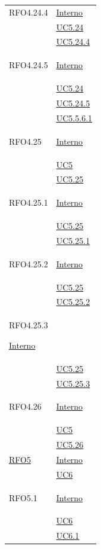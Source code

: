 \begin{itemize}
\begin{itemize}
\begin{itemize}
\begin{itemize}
\begin{longtable}{|>{\centering}m{5cm}|m{5cm}<{\centering}|}
\hypertarget{RFO4.24.4}{RFO4.24.4} &  \hyperlink{Interno}{Interno}\\
&\hyperref[UC5.24]{UC5.24}\\
&\hyperref[UC5.24.4]{UC5.24.4}\\ \hline

\hypertarget{RFO4.24.5}{RFO4.24.5} & \hyperlink{Interno}{Interno}\\
&\hyperref[UC5.24]{UC5.24}\\
&\hyperref[UC5.24.5]{UC5.24.5}\\
&\hyperref[UC5.5.6.1]{UC5.5.6.1}\\ \hline

\hypertarget{RFO4.25}{RFO4.25} & \hyperlink{Interno}{Interno}\\
&\hyperref[UC5]{UC5}\\
&\hyperref[UC5.25]{UC5.25}\\ \hline

\hypertarget{RFO4.25.1}{RFO4.25.1} &  \hyperlink{Interno}{Interno}\\
&\hyperref[UC5.25]{UC5.25}\\
&\hyperref[UC5.25.1]{UC5.25.1}\\ \hline

\hypertarget{RFO4.25.2}{RFO4.25.2} & \hyperlink{Interno}{Interno}\\
&\hyperref[UC5.25]{UC5.25}\\
&\hyperref[UC5.25.2]{UC5.25.2}\\ \hline

\hypertarget{RFO4.25.3}{RFO4.25.3}   \hyperlink{Interno}{Interno}\\
&\hyperref[UC5.25]{UC5.25}\\
&\hyperref[UC5.25.3]{UC5.25.3}\\ \hline

\hypertarget{RFO4.26}{RFO4.26} & \hyperlink{Interno}{Interno}\\
&\hyperref[UC5]{UC5}\\
&\hyperref[UC5.26]{UC5.26}\\ \hline


\hyperlink{RFO5}{RFO5} & \hyperlink{Interno}{Interno}\\
& \hyperref[UC6]{UC6}\\ \hline

\hypertarget{RFO5.1}{RFO5.1}&  \hyperlink{Interno}{Interno}\\
& \hyperref[UC6]{UC6}\\
& \hyperref[UC6.1]{UC6.1}\\ \hline


\end{longtable}
\end{itemize}
\end{itemize}
\end{itemize}
\end{itemize}
